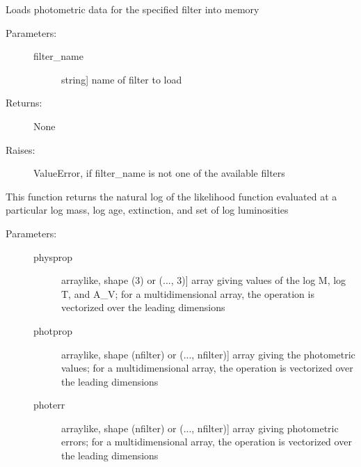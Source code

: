 \documentclass[letterpaper,10pt,english]{sphinxmanual}
\begin{document}
\begin{fulllineitems}
\begin{fulllineitems}
\label{cluster_slug:slugpy.cluster_slug.cluster_slug.load_data}
Loads photometric data for the specified filter into memory
\begin{description}
\item[{Parameters:}] \leavevmode\begin{description}
\item[{filter\_name}] \leavevmode{[}string{]}
name of filter to load

\end{description}

\item[{Returns:}] \leavevmode
None

\item[{Raises:}] \leavevmode
ValueError, if filter\_name is not one of the available
filters

\end{description}

\end{fulllineitems}


\begin{fulllineitems}
\label{cluster_slug:slugpy.cluster_slug.cluster_slug.logL}
This function returns the natural log of the likelihood
function evaluated at a particular log mass, log age,
extinction, and set of log luminosities
\begin{description}
\item[{Parameters:}] \leavevmode\begin{description}
\item[{physprop}] \leavevmode{[}arraylike, shape (3) or (..., 3){]}
array giving values of the log M, log T, and A\_V; for a
multidimensional array, the operation is vectorized over
the leading dimensions

\item[{photprop}] \leavevmode{[}arraylike, shape (nfilter) or (..., nfilter){]}
array giving the photometric values; for a
multidimensional array, the operation is vectorized over
the leading dimensions

\item[{photerr}] \leavevmode{[}arraylike, shape (nfilter) or (..., nfilter){]}
array giving photometric errors; for a multidimensional
array, the operation is vectorized over the leading
dimensions


\end{description}
\end{description}
\end{fulllineitems}
\end{fulllineitems}
\end{document}
